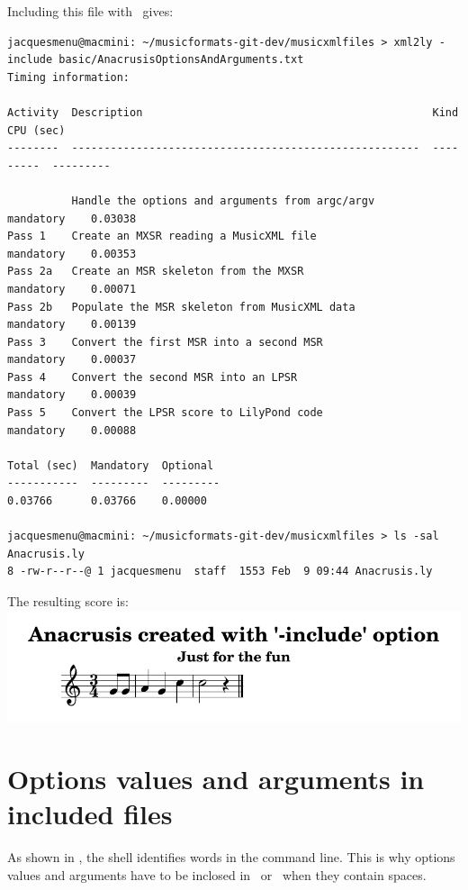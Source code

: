 Including this file with \xmlToLy\ gives:
\begin{lstlisting}[language=Terminal]
jacquesmenu@macmini: ~/musicformats-git-dev/musicxmlfiles > xml2ly -include basic/AnacrusisOptionsAndArguments.txt
Timing information:

Activity  Description                                             Kind       CPU (sec)
--------  ------------------------------------------------------  ---------  ---------

          Handle the options and arguments from argc/argv         mandatory    0.03038
Pass 1    Create an MXSR reading a MusicXML file                  mandatory    0.00353
Pass 2a   Create an MSR skeleton from the MXSR                    mandatory    0.00071
Pass 2b   Populate the MSR skeleton from MusicXML data            mandatory    0.00139
Pass 3    Convert the first MSR into a second MSR                 mandatory    0.00037
Pass 4    Convert the second MSR into an LPSR                     mandatory    0.00039
Pass 5    Convert the LPSR score to LilyPond code                 mandatory    0.00088

Total (sec)  Mandatory  Optional
-----------  ---------  ---------
0.03766      0.03766    0.00000

jacquesmenu@macmini: ~/musicformats-git-dev/musicxmlfiles > ls -sal Anacrusis.ly
8 -rw-r--r--@ 1 jacquesmenu  staff  1553 Feb  9 09:44 Anacrusis.ly
\end{lstlisting}

The resulting score is:\\
\includegraphics[scale=0.7]{../graphics/AnacrusisWithInclude.png}


\section{Options values and arguments in included files}

As shown in , the shell identifies words in the command line. This is why options values and arguments have to be inclosed in \quotes\ or \doubleQuotes\ when they contain spaces.

